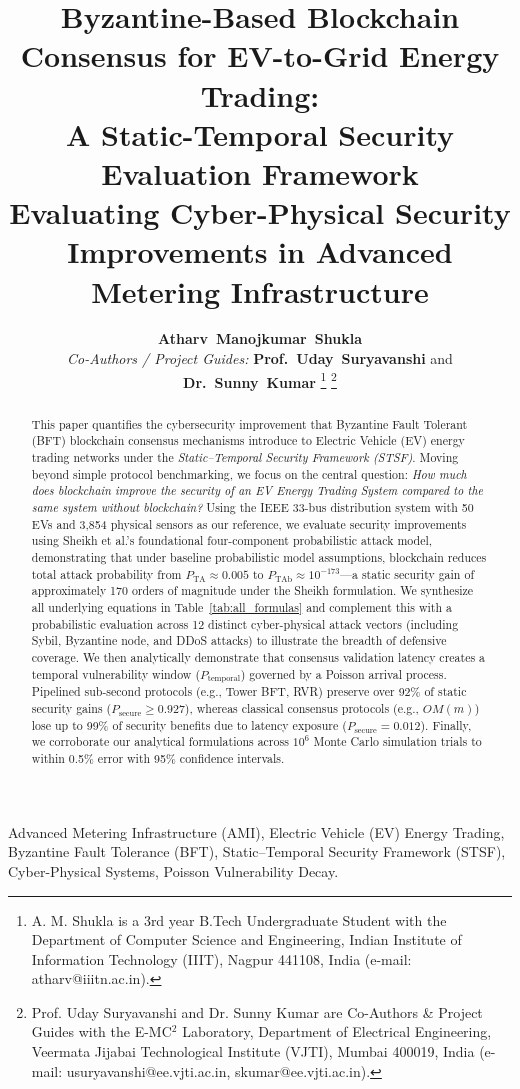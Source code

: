 \documentclass[10pt,twocolumn,journal]{IEEEtran}
\title{\textbf{Byzantine-Based Blockchain Consensus for EV-to-Grid Energy Trading:\\A Static-Temporal Security Evaluation Framework}\\[8pt]
\large Evaluating Cyber-Physical Security Improvements in Advanced Metering Infrastructure}
\author{\textbf{Atharv~Manojkumar~Shukla}\\
\vspace{0.15cm}
\small \emph{Co-Authors / Project Guides:} \textbf{Prof.~Uday~Suryavanshi} and \textbf{Dr.~Sunny~Kumar}%
\thanks{A. M. Shukla is a 3rd year B.Tech Undergraduate Student with the Department of Computer Science and Engineering, Indian Institute of Information Technology (IIIT), Nagpur 441108, India (e-mail: atharv@iiitn.ac.in).}%
\thanks{Prof. Uday Suryavanshi and Dr. Sunny Kumar are Co-Authors \& Project Guides with the E-MC$^2$ Laboratory, Department of Electrical Engineering, Veermata Jijabai Technological Institute (VJTI), Mumbai 400019, India (e-mail: usuryavanshi@ee.vjti.ac.in, skumar@ee.vjti.ac.in).}}
\begin{document}
\maketitle





\begin{abstract}
This paper quantifies the cybersecurity improvement that Byzantine Fault Tolerant (BFT) blockchain consensus mechanisms introduce to Electric Vehicle (EV) energy trading networks under the \emph{Static–Temporal Security Framework (STSF)}. Moving beyond simple protocol benchmarking, we focus on the central question: \emph{How much does blockchain improve the security of an EV Energy Trading System compared to the same system without blockchain?} Using the IEEE 33-bus distribution system with 50 EVs and 3,854 physical sensors as our reference, we evaluate security improvements using Sheikh et al.'s foundational four-component probabilistic attack model, demonstrating that under baseline probabilistic model assumptions, blockchain reduces total attack probability from $P_{\text{TA}} \approx 0.005$ to $P_{\text{TAb}} \approx 10^{-173}$---a static security gain of approximately 170 orders of magnitude under the Sheikh formulation. We synthesize all underlying equations in Table~\ref{tab:all_formulas} and complement this with a probabilistic evaluation across 12 distinct cyber-physical attack vectors (including Sybil, Byzantine node, and DDoS attacks) to illustrate the breadth of defensive coverage. We then analytically demonstrate that consensus validation latency creates a temporal vulnerability window ($P_{\text{temporal}}$) governed by a Poisson arrival process. Pipelined sub-second protocols (e.g., Tower BFT, RVR) preserve over 92\% of static security gains ($P_{\text{secure}} \ge 0.927$), whereas classical consensus protocols (e.g., $OM(m)$) lose up to 99\% of security benefits due to latency exposure ($P_{\text{secure}} = 0.012$). Finally, we corroborate our analytical formulations across $10^6$ Monte Carlo simulation trials to within 0.5\% error with 95\% confidence intervals.
\end{abstract}

\begin{IEEEkeywords}
Advanced Metering Infrastructure (AMI), Electric Vehicle (EV) Energy Trading, Byzantine Fault Tolerance (BFT), Static–Temporal Security Framework (STSF), Cyber-Physical Systems, Poisson Vulnerability Decay.
\end{IEEEkeywords}
\end{document}
